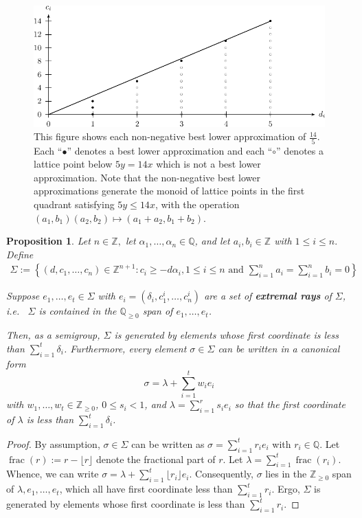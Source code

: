 \documentclass{amsart}
\theoremstyle{plain}
\newtheorem{prop}[thm]{Proposition}
\theoremstyle{definition}
\theoremstyle{remark}
\numberwithin{equation}{section}
\newcommand\bq{{\mathbb Q}}
\newcommand\bz{{\mathbb Z}}
\newcommand\pdeg{\delta}
\DeclareMathOperator{\fr}{frac}
\begin{document}
\begin{figure}
\includegraphics{pics/spin-lower-approximations-pic-pics.pdf}
\caption{This figure shows each non-negative best lower
approximation of $\frac{14}{5}.$ Each ``$\bullet$'' denotes a best
lower approximation and each ``$\circ$'' denotes a lattice point
below $5y=14x$ which is not a best lower approximation.  Note that
the non-negative best lower approximations generate the monoid of
lattice points in the first quadrant satisfying  $5y \le 14x$, with
the operation $(a_1, b_1)(a_2, b_2)\mapsto (a_1 + a_2, b_1 + b_2)$.}
\label{fig:s14/5-lattice}
\end{figure}

\begin{prop}
\label{prop:cone-generation}
Let $n \in \bz,$ let $\alpha_1, \ldots, \alpha_n \in \bq$, and let
$a_i, b_i \in \bz$ with $1 \leq i \leq n.$ Define
\begin{align*}
	\Sigma := \left \{(d, c_1, \ldots, c_n) \in \bz^{n + 1} : c_i \geq -
	d \alpha_i, 1 \leq i \leq n \text{ and } \sum_{i = 1}^{n} a_i =
	\sum_{i	= 1}^{n}b_i = 0 \right \}
\end{align*}

\noindent
Suppose $e_1, \ldots, e_t \in \Sigma$ with $e_i = (\pdeg_i, c_1^i,
\ldots, c_n^i)$ are a set of {\bf extremal rays} of $\Sigma$,
i.e.~ $\Sigma$ is contained in the $\bq_{\geq 0}$ span of
$e_1, \ldots, e_t$.

Then, as a semigroup, $\Sigma$ is generated by
elements whose first coordinate is less than $\sum_{i = 1}^{t}
\pdeg_i$. Furthermore, every element $\sigma \in \Sigma$ can be
written in a canonical form \[\sigma = \lambda + \sum_{i = 1}^{t} w_i e_i\]
with $w_1, \ldots, w_t \in \bz_{\geq 0}$,
$0 \leq s_i < 1$, and $\lambda = \sum_{i = 1}^{r} s_i e_i$ 
so that the
first coordinate of $\lambda$ is less than $\sum_{i=1}^{t}\pdeg_i$.
\end{prop}

\begin{proof}
By assumption, $\sigma \in \Sigma$ can be written as $\sigma = \sum_
{i = 1}^{t} r_i e_i$ with $r_i \in \bq$. Let $\fr(r) := r - \lfloor r
\rfloor$ denote the fractional part of $r$. Let $\lambda = \sum_{i = 1}
^{t} \fr(r_i)$. Whence, we can write $\sigma = \lambda + \sum_{i = 1}
^{t} \lfloor r_i \rfloor e_i.$ Consequently, $\sigma$ lies in the
$\bz_{\geq 0}$ span of $\lambda, e_1, \ldots, e_t$, which all have
first coordinate less than $\sum_{i=1}^{t} r_i$. Ergo, $\Sigma$ is
generated by elements whose first coordinate is less than
$\sum_{i = 1}^{t} r_i$.
\end{proof}
\end{document}
